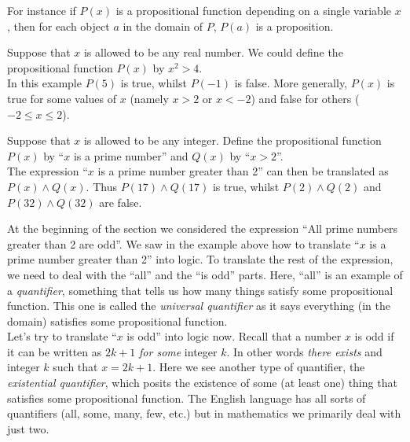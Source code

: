 \noindent For instance if $P(x)$ is a propositional function depending on a single variable $x$, then for each object $a$ in the domain of $P$, $P(a)$ is a proposition.

\begin{example}
Suppose that $x$ is allowed to be any real number. We could define the propositional function $P(x)$ by $x^2>4$.\\

In this example $P(5)$ is true, whilst $P(-1)$ is false. More generally, $P(x)$ is true for some values of $x$ (namely $x>2$ or $x<-2$) and false for others ($-2\le x\le 2$).
\end{example}

\begin{example}
Suppose that $x$ is allowed to be any integer. Define the propositional function $P(x)$ by ``$x$ is a prime number'' and $Q(x)$ by ``$x > 2$''. \\

The expression ``$x$ is a prime number greater than 2'' can then be translated as $P(x) \land Q(x)$. Thus $P(17) \land Q(17)$ is true, whilst $P(2) \land Q(2)$ and $P(32) \land Q(32)$ are false. 
\end{example}

\noindent At the beginning of the section we considered the expression ``All prime numbers greater than 2 are odd''. We saw in the example above how to translate ``$x$ is a prime number greater than 2'' into logic. To translate the rest of the expression, we need to deal with the ``all'' and the ``is odd'' parts. Here, ``all'' is an example of a \emph{quantifier}, something that tells us how many things satisfy some propositional function. This one is called the \emph{universal quantifier} as it says everything (in the domain) satisfies some propositional function.\\

\noindent Let's try to translate ``$x$ is odd'' into logic now. Recall that a number $x$ is odd if it can be written as $2k + 1$ \emph{for some} integer $k$. In other words \emph{there exists} and integer $k$ such that $x = 2k + 1$. Here we see another type of quantifier, the \emph{existential quantifier}, which posits the existence of some (at least one) thing that satisfies some propositional function. The English language has all sorts of quantifiers (all, some, many, few, etc.) but in mathematics we primarily deal with just two.


